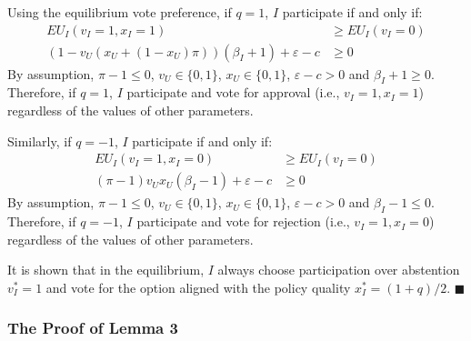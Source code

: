 \par Using the equilibrium vote preference, if $q=1$, $I$ participate if and only if:
\begin{align*}
EU_I(v_I=1,x_I=1) &\geq EU_I(v_I=0) \\
(1- v_U(x_U + (1-x_U) \pi )) (\beta_I + 1) + \varepsilon - c &\geq 0 
\end{align*}
\noindent By assumption, $\pi - 1 \leq 0$, $v_U \in \{0, 1\}$, $x_U  \in \{0, 1\}$, $\varepsilon - c > 0$ and $\beta_I + 1 \geq 0$. Therefore, if $q=1$, $I$ participate and vote for approval (i.e., $v_I=1, x_I=1$) regardless of the values of other parameters.  

\par Similarly, if $q=-1$, $I$ participate if and only if:
\begin{align*}
EU_I(v_I=1,x_I=0) &\geq EU_I(v_I=0)  \\
(\pi - 1) v_U x_U (\beta_I - 1) + \varepsilon - c &\geq 0 
\end{align*}
\noindent By assumption, $\pi - 1 \leq 0$, $v_U \in \{0, 1\}$, $x_U  \in \{0, 1\}$, $\varepsilon - c > 0$ and $\beta_I - 1 \leq 0$. Therefore, if $q=-1$, $I$ participate and vote for rejection (i.e., $v_I=1, x_I=0$) regardless of the values of other parameters. 

\par It is shown that in the equilibrium, $I$ always choose participation over abstention $v^*_I=1$ and vote for the option aligned with the policy quality $x^*_I=(1+q)/2$. \hfill $\blacksquare$

\subsubsection{The Proof of Lemma 3}

